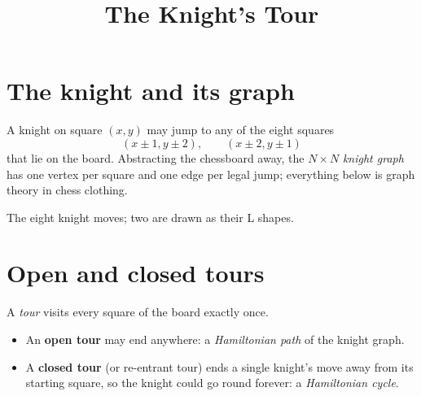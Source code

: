 \documentclass[11pt]{article}
\title{The Knight's Tour}
\author{}
\date{}
\begin{document}
\maketitle
\thispagestyle{fancy}

\section{The knight and its graph}

A knight on square $(x, y)$ may jump to any of the eight squares
\begin{equation}
  (x \pm 1, y \pm 2), \qquad (x \pm 2, y \pm 1)
\end{equation}
that lie on the board. Abstracting the chessboard away, the $N \times N$
\emph{knight graph} has one vertex per square and one edge per legal jump;
everything below is graph theory in chess clothing.

\begin{center}

\smallskip
The eight knight moves; two are drawn as their L shapes.
\end{center}

\section{Open and closed tours}

A \emph{tour} visits every square of the board exactly once.
\begin{itemize}
  \item An \textbf{open tour} may end anywhere: a \emph{Hamiltonian path} of
    the knight graph.
  \item A \textbf{closed tour} (or re-entrant tour) ends a single knight's
    move away from its starting square, so the knight could go round
    forever: a \emph{Hamiltonian cycle}.
\end{itemize}
\end{document}
